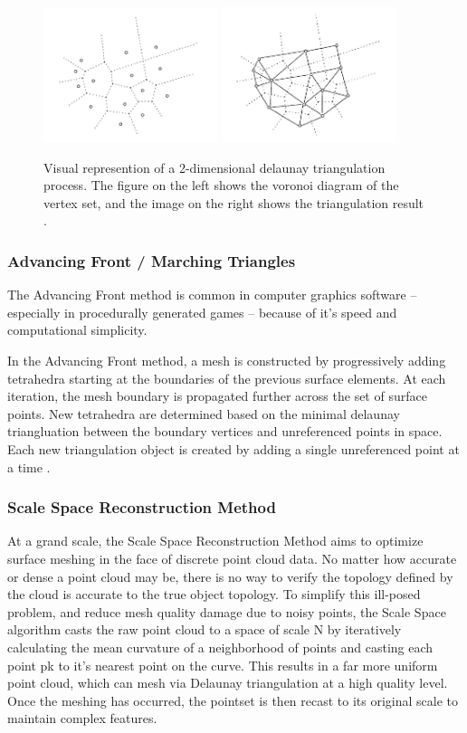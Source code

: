 \documentclass[12pt]{drexelthesis}
\let\Oldsubsubsection\subsubsection
\renewcommand{\subsubsection}{\FloatBarrier\Oldsubsubsection}
\begin{document}
\begin{figure}[!ht]
	\centering
		\includegraphics[width=2in]{delaunayTriangulation/voronoi.jpg}
		\includegraphics[width=2in]{delaunayTriangulation/delaunay.jpg}
	\caption[2D delaunay triangulation]{\centering Visual represention of a 2-dimensional delaunay triangulation process. The figure on the left shows the voronoi diagram of the vertex set, and the image on the right shows the triangulation result \cite{RN65}.}
\end{figure}

\subsubsection{Advancing Front / Marching Triangles}
The Advancing Front method is common in computer graphics software – especially in procedurally generated games – because of it’s speed and computational simplicity.

In the Advancing Front method, a mesh is constructed by progressively adding tetrahedra starting at the boundaries of the previous surface elements. At each iteration, the mesh boundary is propagated further across the set of surface points. New tetrahedra are determined based on the minimal delaunay triangluation between the boundary vertices and unreferenced points in space. Each new triangulation object is created by adding a single unreferenced point at a time \cite{RN66}.

\subsubsection{Scale Space Reconstruction Method}
At a grand scale, the Scale Space Reconstruction Method aims to optimize surface meshing in the face of discrete point cloud data. No matter how accurate or dense a point cloud may be, there is no way to verify the topology defined by the cloud is accurate to the true object topology. To simplify this ill-posed problem, and reduce mesh quality damage due to noisy points, the Scale Space algorithm casts the raw point cloud to a space of scale N by iteratively calculating the mean curvature of a neighborhood of points and casting each point pk to it’s nearest point on the curve. This results in a far more uniform point cloud, which can mesh via Delaunay triangulation at a high quality level. Once the meshing has occurred, the pointset is then recast to its original scale to maintain complex features. 
\end{document}

